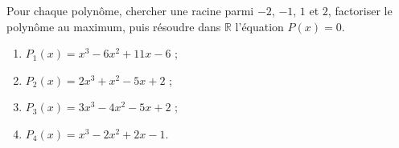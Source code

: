 
\newcommand{\R}{\mathbb{R}}
\newcommand{\vect}[1]{\overrightarrow{#1}}

Pour chaque polynôme, chercher une racine parmi $-2$, $-1$, $1$ et $2$, factoriser le polynôme au maximum, puis résoudre dans $\R$ l'équation $P(x)=0$.
\begin{enumerate}
  \item $P_1(x)=x^3-6x^2+11x-6$ ;
  \item $P_2(x)=2x^3+x^2-5x+2$ ;
  \item $P_3(x)=3x^3-4x^2-5x+2$ ;
  \item $P_4(x)=x^3-2x^2+2x-1$.
\end{enumerate}

